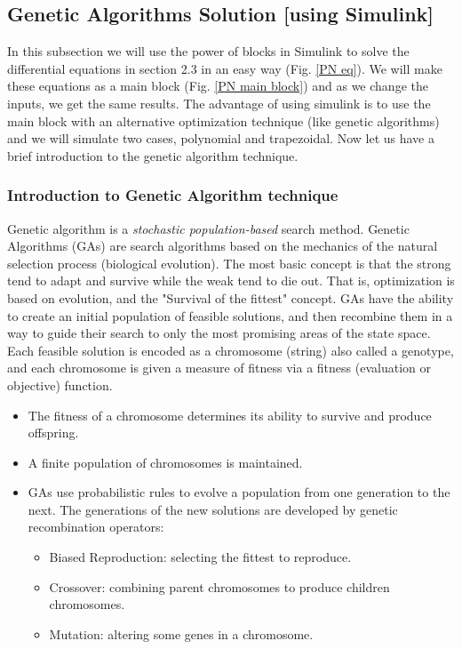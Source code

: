 \subsection{Genetic Algorithms Solution [using Simulink]}


In this subsection we will use the power of blocks in Simulink to solve the differential equations in section 2.3 in an easy way (Fig. \ref{PN eq}). We will make these equations as a main block (Fig. \ref{PN main block}) and as we change the inputs, we get the same results. The advantage of using simulink is to use the main block with an alternative optimization technique (like genetic algorithms) and we will simulate two cases, polynomial and trapezoidal. Now let us have a brief introduction to the genetic algorithm technique.

 \subsubsection{Introduction to Genetic Algorithm technique}
 Genetic algorithm is a \textit{stochastic population-based} search method. Genetic Algorithms (GAs) are   search algorithms based on the mechanics of the natural selection process (biological evolution).  The most basic concept is that the strong tend to adapt and survive while the weak tend to die out. That is, optimization is based on evolution, and the "Survival of the fittest" concept.
 GAs have the ability to create an initial population of feasible solutions, and then recombine them in a way to guide their search to only the most promising areas of the state space.   
 Each feasible solution is encoded as a chromosome (string) also called a genotype, and each chromosome is given a measure of fitness via a fitness (evaluation or objective) function. 
 
 \begin{itemize}
 	\item The fitness of a chromosome determines its ability to survive and produce offspring.
 	\item A finite population of chromosomes is maintained.
 	\item GAs  use  probabilistic  rules  to  evolve  a  population from  one  generation to the next.  The generations of the new solutions are developed by genetic recombination operators:
 	\begin{itemize}
 		\item Biased Reproduction: selecting the fittest to reproduce.
 		\item Crossover: combining parent chromosomes to produce children chromosomes.
 		\item Mutation: altering some genes in a chromosome.
 	\end{itemize}
 \end{itemize}
 
